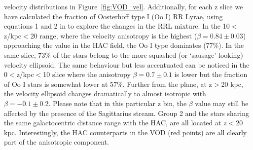 \documentclass[fleqn,usenatbib]{mnras}
\begin{document}
velocity distributions in Figure~\ref{fig:VOD_vel}. Additionally, for
each z slice we have calculated the fraction of Oosterhoff type I (Oo
I) RR Lyrae, using equations 1 and 2 in \citet{Be2018} to explore the
changes in the RRL mixture. In the 10$<$z/kpc$<$20 range, where the
velocity anisotropy is the highest ($\beta = 0.84 \pm 0.03$)
approaching the value in the HAC field, the Oo I type dominates
(77\%). In the same slice, 73\% of the stars belong to the more
squashed (or `sausage' looking) velocity ellipsoid. The same behaviour
but less accentuated can be noticed in the 0$<$z/kpc$<$10 slice where
the anisotropy $\beta = 0.7 \pm 0.1$ is lower but the fraction of Oo I
stars is somewhat lower at 57\%. Further from the plane, at z$>$20
kpc, the velocity ellipsoid changes dramatically to almost isotropic
with $\beta = -0.1 \pm 0.2$. Please note that in this particular z
bin, the $\beta$ value may still be affected by the presence of the
Sagittarius stream. Group 2 and the stars sharing the same
galactocentric distance range with the HAC, are all located at $z<20$
kpc. Interestingly, the HAC counterparts in the VOD (red points) are
all clearly part of the anisotropic component.
\end{document}
